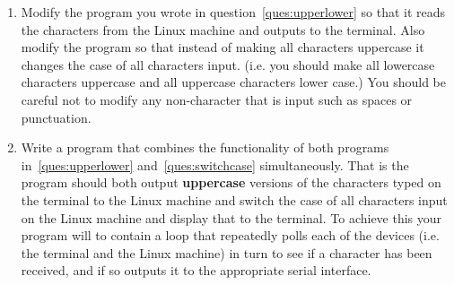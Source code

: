 \documentclass[a4paper,10pt]{article}
\begin{document}
\begin{enumerate}
\item 
\label{ques:switchcase}
Modify the program you wrote in question~\ref{ques:upperlower} so that
it reads the characters from the Linux machine and outputs to the
terminal. Also modify the program so that instead of making all
characters uppercase it changes the case of all characters
input. (i.e. you should make all lowercase characters uppercase and
all uppercase characters lower case.) You should be careful not to
modify any non-character that is input such as spaces or punctuation.

\item 
\label{ques:final}
Write a program that combines the functionality of both programs
in~\ref{ques:upperlower} and~\ref{ques:switchcase}
simultaneously. That is the program should both output
\textbf{uppercase} versions of the characters typed on the terminal to
the Linux machine and switch the case of all characters input on the
Linux machine and display that to the terminal. To achieve this your
program will to contain a loop that repeatedly polls each of the
devices (i.e. the terminal and the Linux machine) in turn to see if a
character has been received, and if so outputs it to the appropriate
serial interface.

\end{enumerate}

\thispagestyle{rcsfooters}
\pagestyle{rcsfooters}
\end{document}
